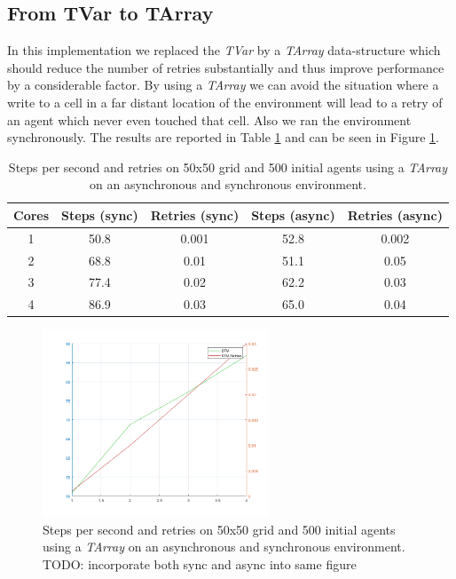\subsection{From TVar to TArray}
In this implementation we replaced the \textit{TVar} by a \textit{TArray} data-structure which should reduce the number of retries substantially and thus improve performance by a considerable factor. By using a \textit{TArray} we can avoid the situation where a write to a cell in a far distant location of the environment will lead to a retry of an agent which never even touched that cell. Also we ran the environment synchronously. The results are reported in Table \ref{tab:tarray_results_syncenv_time} and can be seen in Figure \ref{fig:tarray_results_syncenv_time}.

\begin{table}
	\centering
  	\begin{tabular}{ c || c | c || c | c }
        Cores & Steps (sync) & Retries (sync) & Steps (async) & Retries (async) \\ \hline \hline 
    	1     & 50.8         & 0.001 		    & 52.8        & 0.002 \\ \hline
   		2     & 68.8         & 0.01 		    & 51.1        & 0.05 \\ \hline
   		3     & 77.4         & 0.02 		    & 62.2        & 0.03 \\ \hline
   		4     & 86.9         & 0.03             & 65.0        & 0.04
   	\end{tabular}
  	
  	\caption{Steps per second and retries on 50x50 grid and 500 initial agents using a \textit{TArray} on an asynchronous and synchronous environment.}
	\label{tab:tarray_results_syncenv_time}
\end{table}

\begin{figure}
	\centering
	\includegraphics[width=0.6\textwidth, angle=0]{./fig/sugarscape/tarray_syncenv_500_50x50.png}
	\caption{Steps per second and retries on 50x50 grid and 500 initial agents using a \textit{TArray} on an asynchronous and synchronous environment. TODO: incorporate both sync and async into same figure}
	\label{fig:tarray_results_syncenv_time}
\end{figure}

